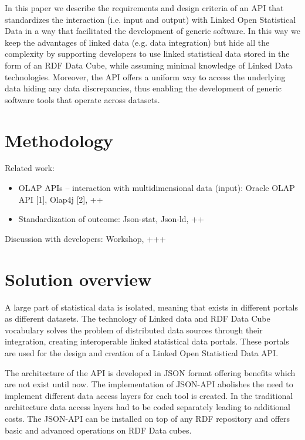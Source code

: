 \documentclass{llncs}
\begin{document}
In this paper we describe the requirements and design criteria of an API that standardizes the interaction (i.e. input and output) with Linked Open Statistical Data in a way that facilitated the development of generic software. In this way we keep the advantages of linked data (e.g. data integration) but hide all the complexity by supporting developers to use linked statistical data stored in the form of an RDF Data Cube, while assuming minimal knowledge of Linked Data technologies. Moreover, the API offers a uniform way to access the underlying data hiding any data discrepancies, thus enabling the development of generic software tools that operate across datasets. 

\section{Methodology}\label{sec:methodology}

Related work:
\begin{itemize}
\item  OLAP APIs – interaction with multidimensional data (input): Oracle OLAP API [1], Olap4j [2], ++
\item Standardization of outcome: Json-stat, Json-ld, ++
\end{itemize}

Discussion with developers: Workshop, +++

\section{Solution overview}\label{sec:overview}

A large part of statistical data is isolated, meaning that exists in different portals as different datasets. The technology of Linked data and RDF Data Cube vocabulary solves the problem of distributed data sources through their integration, creating interoperable linked statistical data portals. These portals are used for the design and creation of a Linked Open Statistical Data API. 

The architecture of the API is developed in JSON format offering benefits which are not exist until now. The implementation of JSON-API abolishes the need to implement different data access layers for each tool is created. In the traditional architecture data access layers had to be coded separately leading to additional costs. The JSON-API can be installed on top of any RDF repository and offers basic and advanced operations on RDF Data cubes. 
\end{document}
